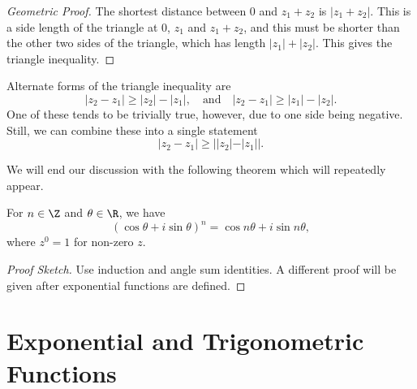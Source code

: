 \begin{center}
  \end{center}

\begin{proof}[Geometric Proof]
	The shortest distance between $0$ and $z_1 + z_2$ is $|z_1 + z_2|$. This is a side length of the triangle at $0$, $z_1$ and $z_1 + z_2$, and this must be shorter than the other two sides of the triangle, which has length $|z_1| + |z_2|$. This gives the triangle inequality. 
\end{proof}

Alternate forms of the triangle inequality are
$$
|z_2 - z_1| \geq |z_2| - |z_1|, \quad \text{and} \quad |z_2  - z_1| \geq |z_1| - |z_2|.
$$
One of these tends to be trivially true, however, due to one side being negative. Still, we can combine these into a single statement
$$
|z_2 - z_1| \geq ||z_2| - |z_1||.
$$

We will end our discussion with the following theorem which will repeatedly appear.

\begin{theorem}
	For $n \in \Z$ and $\theta \in \R$, we have
	$$
	(\cos \theta + i \sin \theta)^n = \cos n \theta + i \sin n \theta,
	$$
	where $z^0 = 1$ for non-zero $z$.
\end{theorem}
\begin{proof}[Proof Sketch]
	Use induction and angle sum identities. A different proof will be given after exponential functions are defined.
\end{proof}

\section{Exponential and Trigonometric Functions}

